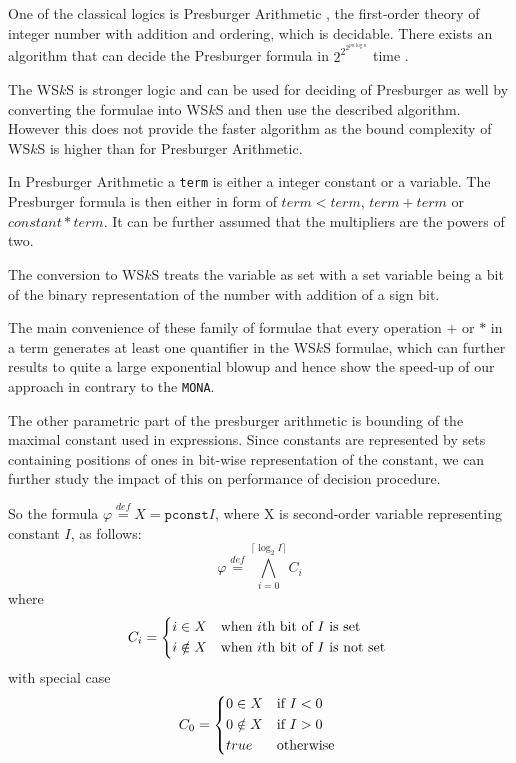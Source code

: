 One of the classical logics is Presburger Arithmetic \cite{pres}, the
first-order theory of integer number with addition and ordering, which is
decidable. There exists an algorithm that can decide the Presburger formula in
$2^{2^{2^{pn\log n}}}$ time \cite{pres-time}. 

The WS$k$S is stronger logic and can be used for deciding of Presburger as well
by converting the formulae into WS$k$S and then use the described algorithm.
However this does not provide the faster algorithm as the bound complexity of
WS$k$S is higher than for Presburger Arithmetic. 

In Presburger Arithmetic a \texttt{term} is either a integer constant or a
variable. The Presburger formula is then either in form of $term < term$, $term
+ term$ or $constant * term$. It can be further assumed that the multipliers
are the powers of two.

The conversion to WS$k$S treats the variable as set with a set variable being a
bit of the binary representation of the number with addition of a sign bit.

The main convenience of these family of formulae that every operation $+$ or $*$
in a term generates at least one quantifier in the WS$k$S formulae, which can
further results to quite a large exponential blowup and hence show the speed-up
of our approach in contrary to the \texttt{MONA}.

The other parametric part of the presburger arithmetic is bounding of the
maximal constant used in expressions. Since constants are represented by sets
containing positions of ones in bit-wise representation of the constant, we can
further study the impact of this on performance of decision procedure.

So the formula $\varphi \overset{\mathit{def}}{=} X = \mathtt{pconst}{I}$, where
X is second-order variable representing constant $I$, as follows:
\begin{equation}
 \varphi \overset{\mathit{def}}{=} \bigwedge_{i = 0}^{\lceil \log_2 I\rceil} C_i
\end{equation}
where
\begin{equation}
  C_i = \begin{dcases*}
         i \in X  & when $i$th bit of $I$ is set\\
         i \notin X & when $i$th bit of $I$ is not set
         \end{dcases*}
\end{equation}
with special case
\begin{equation}
  C_0 = \begin{dcases*}
          0 \in X  & if $I < 0$\\
         0 \notin X & if $I > 0$\\
         true & otherwise
         \end{dcases*}
\end{equation}

